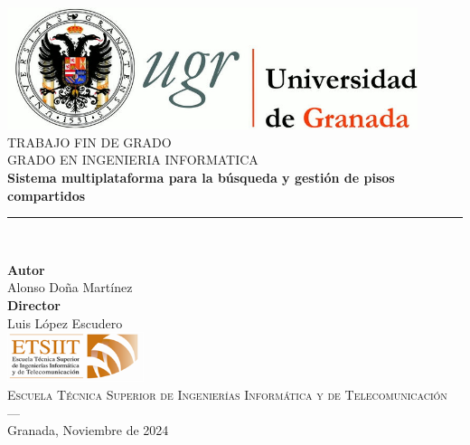 \begin{titlepage}
\newlength{\centeroffset}
\setlength{\centeroffset}{-0.5\oddsidemargin}
\addtolength{\centeroffset}{0.5\evensidemargin}
\thispagestyle{empty}

\noindent\hspace*{\centeroffset}\begin{minipage}{\textwidth}

\centering
\includegraphics[width=0.9\textwidth]{logos/logo_ugr.jpg}\\[1.4cm]

\textsc{ \Large TRABAJO FIN DE GRADO\\[0.2cm]}
\textsc{ GRADO EN INGENIERIA INFORMATICA}\\[1cm]

{\Huge\bfseries Sistema multiplataforma para la búsqueda y gestión de pisos compartidos \\}
\noindent\rule[-1ex]{\textwidth}{3pt}\\[3.5ex]

\end{minipage}

\vspace{1cm}
\noindent\hspace*{\centeroffset}
\begin{minipage}{\textwidth}
\centering

\textbf{Autor}\\ {Alonso Doña Martínez}\\[2.5ex]
\textbf{Director}\\ {Luis López Escudero}\\[2cm]
\includegraphics[width=0.3\textwidth]{logos/etsiit_logo.png}\\[0.1cm]
\textsc{Escuela Técnica Superior de Ingenierías Informática y de Telecomunicación}\\
\textsc{---}\\
Granada, Noviembre de 2024
\end{minipage}
\end{titlepage}
